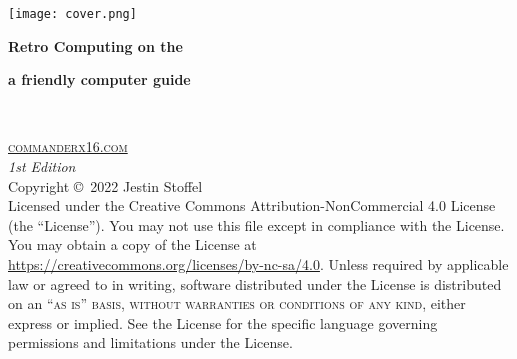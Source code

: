 \documentclass[
	11pt, %
	fleqn, %
	letterpaper, %
]{CommodoreBlueBook}
\begin{document}

\coverpage %
	{\texttt{[image: cover.png]}} %
	{ %
		\centering\rmfamily %
		{\Huge\bfseries Retro Computing on the\par} %
	}
	{
		\centering\rmfamily %
		{\huge\bfseries a friendly computer guide\par} %
	}


\thispagestyle{empty} %

~\vfill %


\noindent \textsc{\href{https://www.commanderx16.com}{commanderx16.com}}\\ %

\noindent \textit{1st Edition}\\ %

\noindent Copyright \copyright\ 2022 Jestin Stoffel\\ %

\noindent Licensed under the Creative Commons Attribution-NonCommercial 4.0
License (the ``License''). You may not use this file except in compliance with
the License. You may obtain a copy of the License at
\url{https://creativecommons.org/licenses/by-nc-sa/4.0}. Unless required by
applicable law or agreed to in writing, software distributed under the License
is distributed on an \textsc{``as is'' basis, without warranties or conditions
of any kind}, either express or implied. See the License for the specific
language governing permissions and limitations under the License.\\ %

\cleardoublepage %
\end{document}
